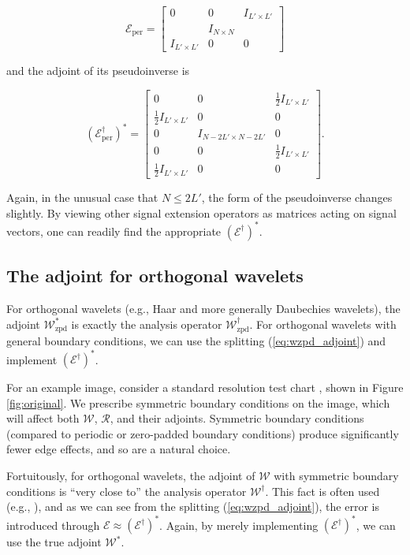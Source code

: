 \documentclass[journal]{IEEEtran}
\begin{document}
\[ \mathcal{E}_\text{per} = \begin{bmatrix} 0 & 0 & I_{L'\times L'}\\&I_{N\times N}&\\I_{L'\times L'}&0&0\end{bmatrix} \] 

\noindent and the adjoint of its pseudoinverse is

\[ \left(\mathcal{E}_\text{per}^\dagger\right)^\ast = \begin{bmatrix} 0 & 0 & \frac{1}{2}I_{L'\times L'}\\\frac{1}{2}I_{L'\times L'}&0&0\\0&I_{N-2L'\times N-2L'}&0\\0&0&\frac{1}{2}I_{L'\times L'}\\\frac{1}{2}I_{L'\times L'}&0&0\end{bmatrix}. \] 

\noindent Again, in the unusual case that $N\le 2L'$, the form of the pseudoinverse changes slightly.  By viewing other signal extension operators as matrices acting on signal vectors, one can readily find the appropriate $(\mathcal{E}^\dagger)^\ast$.


\subsection{The adjoint for orthogonal wavelets}
For orthogonal wavelets (e.g., Haar and more generally Daubechies wavelets), the adjoint $\mathcal{W}_\text{zpd}^\ast$ is exactly the analysis operator $\mathcal{W}_\text{zpd}^\dagger$.  For orthogonal wavelets with general boundary conditions, we can use the splitting (\ref{eq:wzpd_adjoint}) and implement $\left(\mathcal{E}^\dagger\right)^\ast$.

For an example image, consider a standard resolution test chart \cite{weber_1993}, shown in Figure \ref{fig:original}.  We prescribe symmetric boundary conditions on the image, which will affect both $\mathcal{W}$, $\mathcal{R}$, and their adjoints.  Symmetric boundary conditions (compared to periodic or zero-padded boundary conditions) produce significantly fewer edge effects, and so are a natural choice.

Fortuitously, for orthogonal wavelets, the adjoint of $\mathcal{W}$ with symmetric boundary conditions is ``very close to'' the analysis operator $\mathcal{W}^\dagger$.  This fact is often used (e.g., \cite{beck_2009}), and as we can see from the splitting (\ref{eq:wzpd_adjoint}), the error is introduced through $\mathcal{E} \approx \left(\mathcal{E}^\dagger\right)^\ast$.  Again, by merely implementing $\left(\mathcal{E}^\dagger\right)^\ast$, we can use the true adjoint $\mathcal{W}^\ast$.
\end{document}
